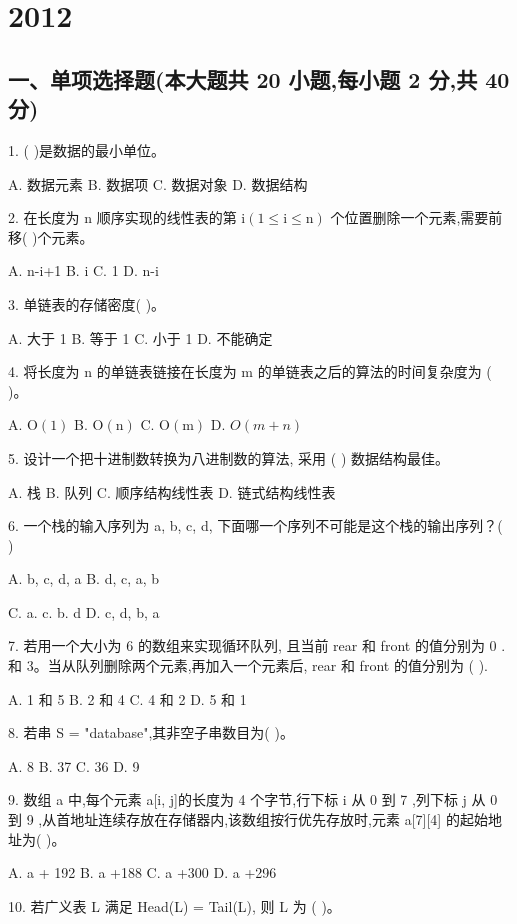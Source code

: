\chapter{2012} 
\section*{一、单项选择题(本大题共 20 小题,每小题 2 分,共 40 分)}

1. (   )是数据的最小单位。

A. 数据元素 B. 数据项 C. 数据对象 D. 数据结构

2. 在长度为 \(\mathrm{n}\) 顺序实现的线性表的第 \(\mathrm{i}\left( {1 \leq  \mathrm{i} \leq  \mathrm{n}}\right)\) 个位置删除一个元素,需要前移(   )个元素。

A. n-i+1 B. i C. 1 D. n-i

3. 单链表的存储密度(   )。

A. 大于 1 B. 等于 1 C. 小于 1 D. 不能确定

4. 将长度为 \(\mathrm{n}\) 的单链表链接在长度为 \(\mathrm{m}\) 的单链表之后的算法的时间复杂度为 (   )。

A. \(\mathrm{O}\left( 1\right)\) B. \(\mathrm{O}\left( \mathrm{n}\right)\) C. \(\mathrm{O}\left( \mathrm{m}\right)\) D. \(O\left( {m + n}\right)\)

5. 设计一个把十进制数转换为八进制数的算法, 采用 (   ) 数据结构最佳。

A. 栈 B. 队列 C. 顺序结构线性表 D. 链式结构线性表

6. 一个栈的输入序列为 a, b, c, d, 下面哪一个序列不可能是这个栈的输出序列？(   )

A. b, c, d, a B. d, c, a, b

C. a. c. b. d D. c, d, b, a

7. 若用一个大小为 6 的数组来实现循环队列, 且当前 rear 和 front 的值分别为 0 . 和 3。当从队列删除两个元素,再加入一个元素后, rear 和 front 的值分别为 (   ).

A. 1 和 5 B. 2 和 4 C. 4 和 2 D. 5 和 1

8. 若串 S = "database",其非空子串数目为(   )。

A. 8 B. 37 C. 36 D. 9

9. 数组 a 中,每个元素 a[i, j]的长度为 4 个字节,行下标 i 从 0 到 7 ,列下标 j 从 0 到 9 ,从首地址连续存放在存储器内,该数组按行优先存放时,元素 a[7][4] 的起始地址为(   )。

A. a + 192 B. a +188 C. a +300 D. a +296

10. 若广义表 L 满足 Head(L) = Tail(L), 则 L 为 (   )。


